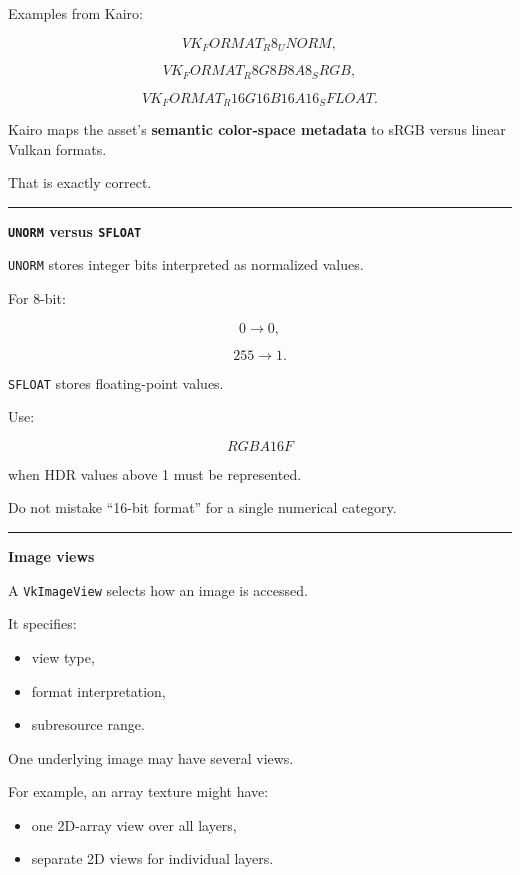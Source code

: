 Examples from Kairo:

\[
VK_FORMAT_R8_UNORM,
\]

\[
VK_FORMAT_R8G8B8A8_SRGB,
\]

\[
VK_FORMAT_R16G16B16A16_SFLOAT.
\]

Kairo maps the asset's \textbf{semantic color-space metadata} to sRGB versus linear Vulkan formats.

That is exactly correct.

\begin{center}\rule{0.5\linewidth}{0.5pt}\end{center}

\textbf{\texttt{UNORM} versus \texttt{SFLOAT}}

\texttt{UNORM} stores integer bits interpreted as normalized values.

For 8-bit:

\[
0\rightarrow0,
\]

\[
255\rightarrow1.
\]

\texttt{SFLOAT} stores floating-point values.

Use:

\[
RGBA16F
\]

when HDR values above 1 must be represented.

Do not mistake ``16-bit format'' for a single numerical category.

\begin{center}\rule{0.5\linewidth}{0.5pt}\end{center}

\textbf{Image views}

A \texttt{VkImageView} selects how an image is accessed.

It specifies:

\begin{itemize}
\tightlist
\item
  view type,
\item
  format interpretation,
\item
  subresource range.
\end{itemize}

One underlying image may have several views.

For example, an array texture might have:

\begin{itemize}
\tightlist
\item
  one 2D-array view over all layers,
\item
  separate 2D views for individual layers.
\end{itemize}

